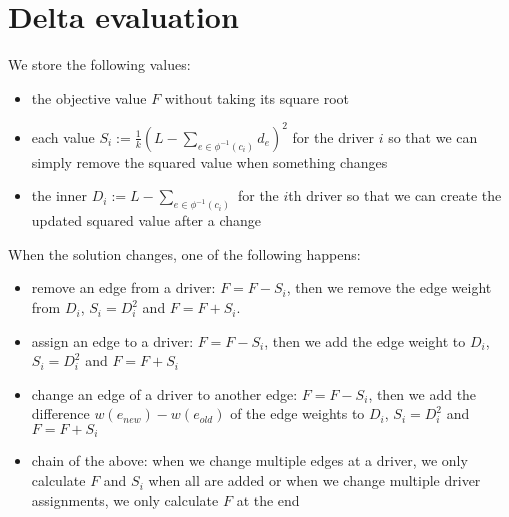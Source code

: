 \documentclass{article}
\begin{document}
\section*{Delta evaluation}
We store the following values:
\begin{itemize}
	\item the objective value $F$ without taking its square root
	\item each value $S_i := \frac{1}{k}(L-\sum_{e\in\phi^{-1}(c_i)}{d_e})^2$ for the driver $i$ so that we can simply remove the squared value when something changes
	\item the inner $D_i := L-\sum_{e\in\phi^{-1}(c_i)}$ for the $i$th driver so that we can create the updated squared value after a change
\end{itemize}
When the solution changes, one of the following happens:
\begin{itemize}
	\item remove an edge from a driver: $F = F - S_i$, then we remove the edge weight from $D_i$, $S_i = D_i^2$ and $F = F + S_i$.
	\item assign an edge to a driver: $F = F - S_i$, then we add the edge weight to $D_i$, $S_i = D_i^2$ and $F = F + S_i$
	\item change an edge of a driver to another edge: $F = F - S_i$, then we add the difference $w(e_{new}) - w(e_{old})$ of the edge weights to $D_i$, $S_i = D_i^2$ and $F = F + S_i$
	\item chain of the above: when we change multiple edges at a driver, we only calculate $F$ and $S_i$ when all are added or when we change multiple driver assignments, we only calculate $F$ at the end
\end{itemize}
\end{document}
